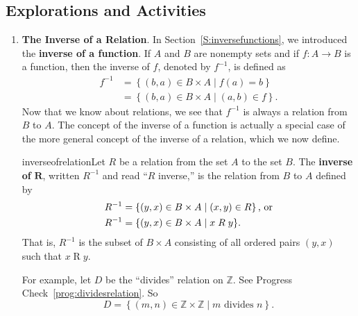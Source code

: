 \subsection*{Explorations and Activities}
\setcounter{oldenumi}{\theenumi}
\begin{enumerate} \setcounter{enumi}{\theoldenumi} 
\item \textbf{The Inverse of a Relation}.  
In Section~\ref{S:inversefunctions}, we introduced the \textbf{inverse of a function}.
%
%
 If  $A$ and $B$ are nonempty sets and if $f:A \to B$ is a function, then the inverse of  $f$, denoted by  $f^{ - 1} $, is defined as
\begin{align*}
f^{ - 1}  &= \left\{ { {\left( {b, a} \right) \in B \times A } \mid f\left( a \right) = b} \right\} \\
          &= \left\{ { {\left( {b, a} \right) \in B \times A } \mid \left( {a, b} \right) \in f} \right\}\!.
\end{align*}
Now that we know about relations, we see that  $f^{ - 1} $  is always a relation from  $B$  to 
$A$.  The concept of the inverse of a function is actually a special case of the more general concept of the inverse of a relation, which we now define.
\begin{defbox}{inverseofrelation}{Let  $R$  be a relation from the set  $A$  to the set  $B$.  The \textbf{inverse of}  $\boldsymbol{R}$,
%
%
 written  $R^{ - 1} $ 
\label{sym:Rinverse} and read  ``$R$  inverse,'' is the relation from  $B$  to  $A$  defined by
\[
\begin{aligned}
  R^{ - 1}  &= \left\{ { {\left( {y, x} \right) \in B \times A } \mid \left( {x, y} \right) \in R} \right\}\text{, or} \hfill \\
  R^{ - 1}  &= \left\{ { {\left( {y, x} \right) \in B \times A } \mid x \mathrel{R} y} \right\}\!. \\ 
\end{aligned} 
\]
That is, $R^{ - 1} $ is the subset of  $B \times A$ consisting of all ordered pairs  
$\left( {y, x} \right)$  such that  $x \mathrel{R} y$.}
\end{defbox}
For example, let $D$ be the ``divides'' relation on  $\mathbb{Z}$.  See Progress 
Check~\ref{prog:dividesrelation}.  So
\[
D = \left\{ { {\left( {m, n} \right) \in \mathbb{Z} \times \mathbb{Z} } \mid m\text{  divides  }n} \right\}\!.
\]
\end{enumerate}
